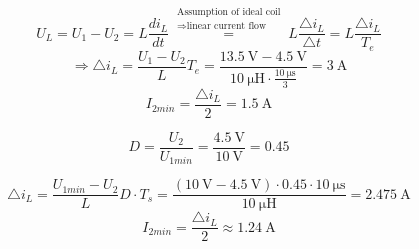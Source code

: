 \begin{solutionblock}
\begin{equation}
    \end{equation}
    \begin{equation}
        U_L = U_1 - U_2 = L \frac{d i_L}{dt} \overset {\begin{matrix}\text{Assumption of ideal coil}\\ \Rightarrow \text{linear current flow} \end{matrix}} = L \frac{\triangle i_L}{\triangle t} = L \frac{\triangle i_L}{T_e}
    \end{equation}
    \begin{equation}
        \Rightarrow \triangle i_L = \frac{U_1 - U_2}{L} T_e = \frac{\SI{13.5}{\volt} - \SI{4.5}{\volt}}{\SI{10}{\micro \henry} \cdot \frac{\SI{10}{\micro \second}}{3}} = \SI{3}{\ampere}
    \end{equation}
    \begin{equation}
        I_{2min} = \frac{\triangle i_L}{2} = \SI{1.5}{\ampere}
    \end{equation}
\end{solutionblock}

\begin{solutionblock}
    \begin{equation}    
        D= \frac{U_2}{U_{1min}} = \frac{\SI{4.5}{\volt}}{\SI{10}{\volt}} = 0.45
    \end{equation}    
\end{solutionblock}

\begin{solutionblock}
    \begin{equation}
        \triangle i_L = \frac{U_{1min} - U_2}{L} D \cdot T_s = \frac{(\SI{10}{\volt} - \SI{4.5}{\volt}) \cdot 0.45 \cdot \SI{10}{\micro \second}}{\SI{10}{\micro \henry}} = \SI{2.475}{\ampere}
    \end{equation}
    \begin{equation}
        I_{2min} = \frac{\triangle i_L}{2} \approx \SI{1.24}{\ampere}
    \end{equation}
\end{solutionblock}


